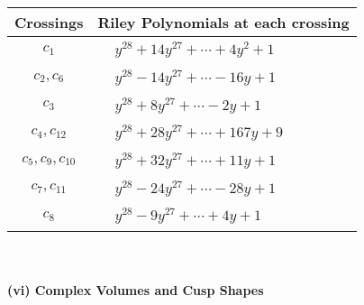 \documentclass[1p]{elsarticle_modified}
\theoremstyle{definition}
\begin{document}
\begin{tabular}{m{50pt}|m{274pt}}
Crossings & \hspace{64pt}Riley Polynomials at each crossing \\
\hline $$\begin{aligned}c_{1}\end{aligned}$$&$\begin{aligned}
&y^{28}+14 y^{27}+\cdots+4 y^2+1
\end{aligned}$\\
\hline $$\begin{aligned}c_{2},c_{6}\end{aligned}$$&$\begin{aligned}
&y^{28}-14 y^{27}+\cdots-16 y+1
\end{aligned}$\\
\hline $$\begin{aligned}c_{3}\end{aligned}$$&$\begin{aligned}
&y^{28}+8 y^{27}+\cdots-2 y+1
\end{aligned}$\\
\hline $$\begin{aligned}c_{4},c_{12}\end{aligned}$$&$\begin{aligned}
&y^{28}+28 y^{27}+\cdots+167 y+9
\end{aligned}$\\
\hline $$\begin{aligned}c_{5},c_{9},c_{10}\end{aligned}$$&$\begin{aligned}
&y^{28}+32 y^{27}+\cdots+11 y+1
\end{aligned}$\\
\hline $$\begin{aligned}c_{7},c_{11}\end{aligned}$$&$\begin{aligned}
&y^{28}-24 y^{27}+\cdots-28 y+1
\end{aligned}$\\
\hline $$\begin{aligned}c_{8}\end{aligned}$$&$\begin{aligned}
&y^{28}-9 y^{27}+\cdots+4 y+1
\end{aligned}$\\
\hline
\end{tabular}\\~\\
\newpage\flushleft \textbf{(vi) Complex Volumes and Cusp Shapes}
\end{document}
